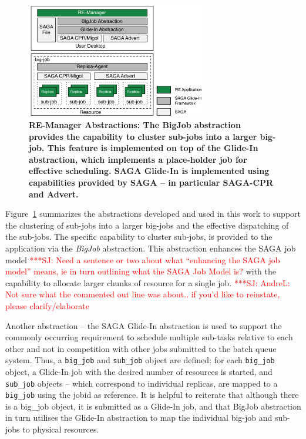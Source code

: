 \documentclass{rspublic}
\newcommand{\jhanote}[1]{ {\textcolor{red} { ***SJ: #1 }}}
\newcommand{\jhanote}[1]{}
\begin{document}
\begin{figure}[t]
      \centering
      \includegraphics[width=0.7\textwidth]{remdmanager_v12}   
      \caption{\footnotesize \bf RE-Manager Abstractions: The BigJob
        abstraction provides the capability to cluster sub-jobs into a
        larger big-job. This feature is implemented on top of the
        Glide-In abstraction, which %
        implements a place-holder job for effective scheduling.  SAGA
        Glide-In is implemented using capabilities provided by SAGA --
        in particular SAGA-CPR and Advert.}
      \label{fig:abstractions}
\end{figure}

Figure~\ref{fig:abstractions} summarizes the abstractions developed
and used in this work to support the clustering of sub-jobs into a
larger big-jobs and the effective dispatching of the sub-jobs.  The
specific capability to cluster sub-jobs, is provided to the
application via the \emph{BigJob} abstraction. This abstraction
enhances the SAGA job model \jhanote{Need a sentence or two about what
  ``enhancing the SAGA job model'' means, ie in turn outlining what
  the SAGA Job Model is?}  with the capability to allocate
larger chunks of resource for a single job.
\jhanote{AndreL: Not sure what the commented out line was about.. if
  you'd like to reinstate, please clarify/elaborate}

Another abstraction
-- the SAGA Glide-In abstraction is used to support the commonly
occurring requirement to schedule multiple sub-tasks relative to each
other and not in competition with other jobs submitted to the batch
queue system.  Thus, a \texttt{big\_job} and \texttt{sub\_job} object
are defined; for each \texttt{big\_job} object, a Glide-In job with
the desired number of resources is started, and \texttt{sub\_job}
objects -- which correspond to individual replicas, are mapped to a
\texttt{big\_job} using the jobid as reference. It is helpful to
reiterate that although there is a big\_job object, it is submitted
as a Glide-In job, and that BigJob abstraction in turn utilises the
Glide-In abstraction to map the individual big-job and sub-jobs to
physical resources.
\end{document}
